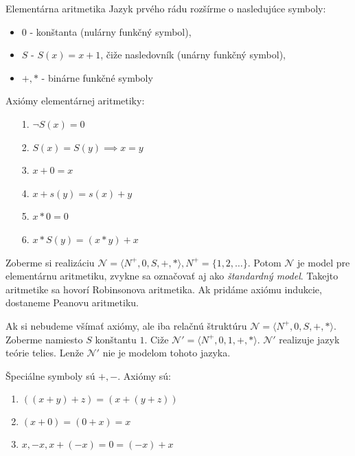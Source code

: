 \begin{priklad}{Elementárna aritmetika}
    Jazyk prvého rádu rozšírme o nasledujúce symboly:
    \begin{itemize}
        \item $0$ - konštanta (nulárny funkčný symbol),
        \item $S$ - $S(x)=x+1$, čiže nasledovník (unárny funkčný symbol),
        \item $+,*$ - binárne funkčné symboly
    \end{itemize}
    Axiómy elementárnej aritmetiky:
    \begin{itemize}
        \item[1.] $\neg S(x) = 0$
        \item[2.] $S(x) = S(y) \implies x=y$
        \item[3.] $x+0 = x$
        \item[4.] $x+s(y) = s(x) + y$
        \item[5.] $x * 0 = 0$
        \item[6.] $x * S(y) = (x*y)+x$
    \end{itemize}
    Zoberme si realizáciu 
        $\mathcal{N}=\langle N^+,0,S,+,* \rangle, N^+ =
        \{1,2,\dots\}$.
        Potom $\mathcal{N}$ je model pre elementárnu aritmetiku,
        zvykne sa označovať aj ako \emph{štandardný model}.
        Takejto aritmetike sa hovorí Robinsonova aritmetika.
        Ak pridáme axiómu indukcie, dostaneme Peanovu aritmetiku.
\end{priklad}

\begin{poznamka}
    Ak si nebudeme všímať axiómy, ale iba relačnú štruktúru
    $\mathcal{N}=\langle N^+,0,S,+,* \rangle$.
    Zoberme namiesto $S$ konštantu $1$.
    Ciže $\mathcal{N}'=\langle N^+,0,1,+,* \rangle$.
    $\mathcal{N}'$ realizuje jazyk teórie telies.
    Lenže $\mathcal{N}'$ nie je modelom tohoto jazyka. 
\end{poznamka}

\begin{priklad}
    Špeciálne symboly sú $+,-$.
    Axiómy sú:
    \begin{enumerate}
            \item $((x+y)+z) = (x+(y+z))$
            \item $(x+0) = (0+x) = x$
            \item $x, -x, x+(-x) = 0 = (-x)+x$
    \end{enumerate}
\end{priklad}

